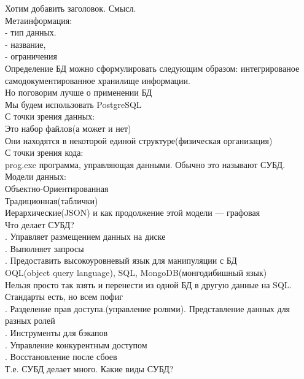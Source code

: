 \noindent Хотим добавить заголовок. Смысл. \\
\noindent Метаинформация:  \\
\noindent - тип данных. \\
\noindent - название, \\
\noindent - ограничения \\

\noindent Определение БД можно сформулировать следующим образом: интегрированое самодокументированное хранилище информации. \\

\noindent Но поговорим лучше о применении БД \\
\noindent Мы будем использовать PostgreSQL \\

\noindent С точки зрения данных: \\
\noindent Это набор файлов(а может и нет) \\
\noindent Они находятся в некоторой единой структуре(физическая организация) \\
\noindent С точки зрения кода: \\
\noindent prog.exe программа, управляющая данными. Обычно это называют СУБД. \\

\noindent Модели данных: \\
\noindent Объектно-Ориентированная \\
\noindent Традиционная(таблички) \\
\noindent Иерархические(JSON) и как продолжение этой модели — графовая \\

\noindent Что делает СУБД? \\
. Управляет размещением данных на диске \\
. Выполняет запросы \\
. Предоставить высокоуровневый язык для манипуляции с БД \\
\noindent OQL(object query language), SQL, MongoDB(монгодибишный язык) \\
\noindent Нельзя просто так взять и перенести из одной БД в другую данные на SQL. \\
\noindent Стандарты есть, но всем пофиг \\
. Разделение прав доступа.(управление ролями). Представление данных для разных ролей \\
. Инструменты для бэкапов \\
. Управление конкурентным доступом \\
. Восстановление после сбоев \\
\noindent Т.е. СУБД делает много. Какие виды СУБД? \\

